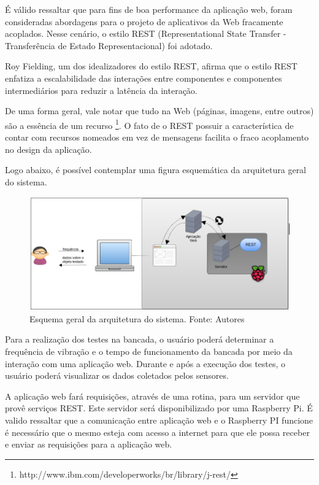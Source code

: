 É válido ressaltar que para fins de boa performance da aplicação web, foram consideradas abordagens para o projeto de aplicativos 
da Web fracamente acoplados. Nesse cenário, o estilo REST (Representational State Transfer - Transferência de Estado Representacional)
foi adotado.

Roy Fielding, um dos idealizadores do estilo REST,  afirma que o estilo REST enfatiza a escalabilidade das interações entre 
componentes e componentes intermediários para reduzir a latência da interação.

De uma forma geral, vale notar que tudo na Web (páginas, imagens, entre outros) são a essência de um recurso \footnote{http://www.ibm.com/developerworks/br/library/j-rest/}.
O fato de o REST  possuir a  característica de contar com recursos nomeados em vez de mensagens facilita o fraco acoplamento 
no design da aplicação.

Logo abaixo, é possível contemplar uma figura esquemática da arquitetura geral do sistema.

\begin{figure}[!ht]
\centering
\includegraphics[scale=0.5]{figuras/arquitetura_sistema.png}
\caption{Esquema geral da arquitetura do sistema. Fonte: Autores}
\label{fig:arquitetura_sistema}
\end{figure}

Para a realização dos testes na bancada, o usuário poderá determinar a frequência de vibração e o tempo de funcionamento da 
bancada por meio da interação com uma aplicação web. Durante e após a execução dos testes, o usuário poderá visualizar os dados
coletados pelos sensores.

A aplicação web fará requisições, através de uma rotina, para um servidor que provê serviços REST. Este servidor será disponibilizado
por uma Raspberry Pi. É valido ressaltar que a comunicação entre aplicação web e o Raspberry PI funcione é necessário que o mesmo 
esteja com acesso a internet para que ele possa receber e enviar as requisições para a aplicação web.

